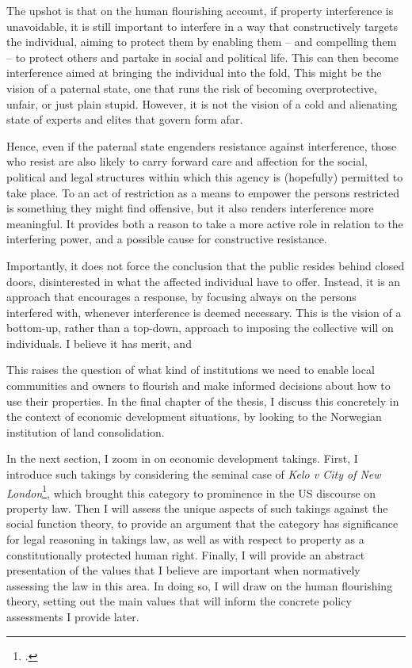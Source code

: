 {The upshot is that on the human flourishing account, if property interference is unavoidable, it is still important to interfere in a way that constructively targets the individual, aiming to protect them by enabling them -- and compelling them -- to protect others and partake in social and political life. This can then become interference aimed at bringing the individual into the fold,  This might be the vision of a paternal state, one that runs the risk of becoming overprotective, unfair, or just plain stupid. However, it is 
not the vision of a cold and alienating state of experts and elites that govern form afar.

Hence, even if the paternal state engenders resistance against interference, those who resist are also likely to carry forward care and affection for the social, political and legal structures within which this agency is (hopefully) permitted to take place. To  an act of restriction as a means to empower the persons restricted is something they might find offensive, but it also renders interference more meaningful. It provides both a reason to take a more active role in relation to the interfering power, and a possible cause for constructive resistance. 

Importantly, it does not force the conclusion that the public resides behind closed doors, disinterested in what the affected individual have to offer. Instead, it is an approach that encourages a response, by focusing always on the persons interfered with, whenever interference is deemed necessary. This is the vision of a bottom-up, rather than a top-down, approach to imposing the collective will on individuals. I believe it has merit, and 
}

This raises the question of what kind of institutions we need to enable local communities and owners to  flourish and make informed decisions about how to use their properties. In the final chapter of the thesis, I discuss this concretely in the context of economic development situations, by looking to the Norwegian institution of land consolidation.

In the next section, I zoom in on economic development takings. First, I introduce such takings by considering the seminal case of {\it Kelo v City of New London}\footcite{kelo05}, which brought this category to prominence in the US discourse on property law. Then I will assess the unique aspects of such takings against the social function theory, to provide an argument that the category has significance for legal reasoning in takings law, as well as with respect to property as a constitutionally protected human right. Finally, I will provide an abstract presentation of the values that I believe are important when normatively assessing the law in this area. In doing so, I will draw on the human flourishing theory, setting out the main values that will inform the concrete policy assessments I provide later. 

